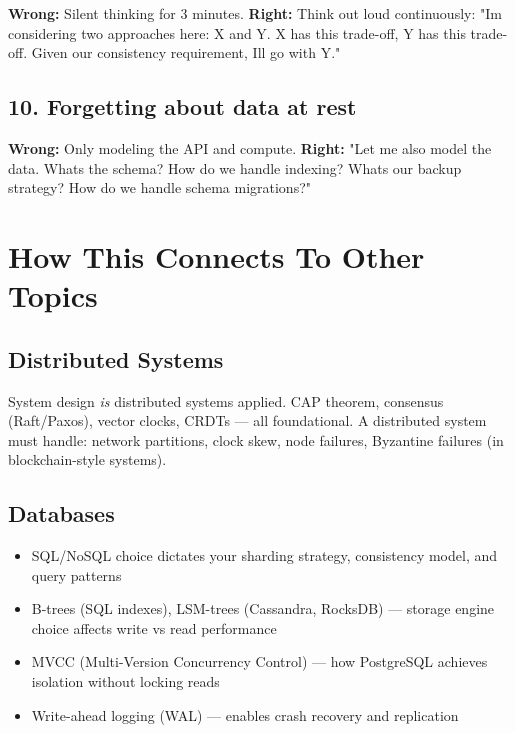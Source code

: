 \documentclass[11pt]{article}
\providecommand{\tightlist}{\setlength{\itemsep}{1pt}\setlength{\parskip}{0pt}}
\begin{document}
\textbf{Wrong:} Silent thinking for 3 minutes.
\textbf{Right:} Think out loud continuously: "I\textquotesingle m considering two approaches here: X and Y. X has this trade-off, Y has this trade-off. Given our consistency requirement, I\textquotesingle ll go with Y."

\subsection{10. Forgetting about data at rest}\label{10-forgetting-about-data-at-rest}

\textbf{Wrong:} Only modeling the API and compute.
\textbf{Right:} "Let me also model the data. What\textquotesingle s the schema? How do we handle indexing? What\textquotesingle s our backup strategy? How do we handle schema migrations?"

\section{How This Connects To Other Topics}\label{how-this-connects-to-other-topics}

\subsection{Distributed Systems}\label{distributed-systems}

System design \emph{is} distributed systems applied. CAP theorem, consensus (Raft/Paxos), vector clocks, CRDTs --- all foundational. A distributed system must handle: network partitions, clock skew, node failures, Byzantine failures (in blockchain-style systems).

\subsection{Databases}\label{databases}

\begin{itemize}
\tightlist
\item
  SQL/NoSQL choice dictates your sharding strategy, consistency model, and query patterns
\item
  B-trees (SQL indexes), LSM-trees (Cassandra, RocksDB) --- storage engine choice affects write vs read performance
\item
  MVCC (Multi-Version Concurrency Control) --- how PostgreSQL achieves isolation without locking reads
\item
  Write-ahead logging (WAL) --- enables crash recovery and replication
\end{itemize}
\end{document}
